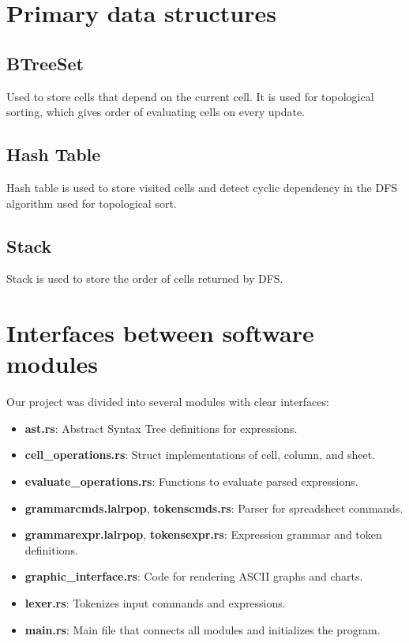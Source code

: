 \documentclass{article}
\begin{document}
\section{Primary data structures}
\subsection{BTreeSet}
Used to store cells that depend on the current cell. It is used for topological sorting, which gives order of evaluating cells on every update.

\subsection{Hash Table}
Hash table is used to store visited cells and detect cyclic dependency in the DFS algorithm used for topological sort.

\subsection{Stack}
Stack is used to store the order of cells returned by DFS.

\section{Interfaces between software modules}
Our project was divided into several modules with clear interfaces:

\begin{itemize}
    \item \textbf{ast.rs}: Abstract Syntax Tree definitions for expressions.
    \item \textbf{cell\_operations.rs}: Struct implementations of cell, column, and sheet.
    \item \textbf{evaluate\_operations.rs}: Functions to evaluate parsed expressions.
    \item \textbf{grammarcmds.lalrpop}, \textbf{tokenscmds.rs}: Parser for spreadsheet commands.
    \item \textbf{grammarexpr.lalrpop}, \textbf{tokensexpr.rs}: Expression grammar and token definitions.
    \item \textbf{graphic\_interface.rs}: Code for rendering ASCII graphs and charts.
    \item \textbf{lexer.rs}: Tokenizes input commands and expressions.
    \item \textbf{main.rs}: Main file that connects all modules and initializes the program.
\end{itemize}
\end{document}
